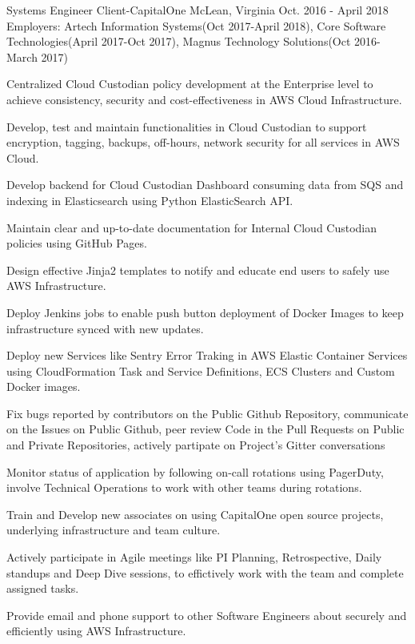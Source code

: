 \begin{cventries}
  \cventryemp
    {Systems Engineer} %
    {Client-CapitalOne} %
    {McLean, Virginia} %
    {Oct. 2016 - April 2018} %
    {Employers: Artech Information Systems(Oct 2017-April 2018), Core Software Technologies(April 2017-Oct 2017), Magnus Technology Solutions(Oct 2016-March 2017)}
    {
      \begin{cvitems} %
        \item {Centralized Cloud Custodian policy development at the Enterprise level to achieve consistency, security and cost-effectiveness in AWS Cloud Infrastructure.}
        \item {Develop, test and maintain functionalities in Cloud Custodian to support encryption, tagging, backups, off-hours, network security for all services in AWS Cloud.}
        \item {Develop backend for Cloud Custodian Dashboard consuming data from SQS and indexing in Elasticsearch using Python ElasticSearch API.}
        \item {Maintain clear and up-to-date documentation for Internal Cloud Custodian policies using GitHub Pages.}
        \item {Design effective Jinja2 templates to notify and educate end users to safely use AWS Infrastructure.}
        \item {Deploy Jenkins jobs to enable push button deployment of Docker Images to keep infrastructure synced with new updates.}
        \item {Deploy new Services like Sentry Error Traking in AWS Elastic Container Services using CloudFormation Task and Service Definitions, ECS Clusters and Custom Docker images.}
        \item {Fix bugs reported by contributors on the Public Github Repository, communicate on the Issues on Public Github, peer review Code in the Pull Requests on Public and Private Repositories, actively partipate on Project's Gitter conversations}
        \item {Monitor status of application by following on-call rotations using PagerDuty, involve Technical Operations to work with other teams during rotations.}
        \item {Train and Develop new associates on using CapitalOne open source projects, underlying infrastructure and team culture.}
        \item {Actively participate in Agile meetings like PI Planning, Retrospective, Daily standups and Deep Dive sessions, to effictively work with the team and complete assigned tasks.}
        \item {Provide email and phone support to other Software Engineers about securely and efficiently using AWS Infrastructure.}
      \end{cvitems}
    }


\end{cventries}
